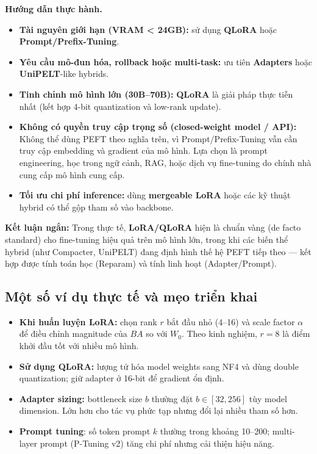 \textbf{Hướng dẫn thực hành.}
\begin{itemize}
	\item \textbf{Tài nguyên giới hạn (VRAM < 24GB):} sử dụng \textbf{QLoRA} hoặc \textbf{Prompt/Prefix-Tuning}.  
	\item \textbf{Yêu cầu mô-đun hóa, rollback hoặc multi-task:} ưu tiên \textbf{Adapters} hoặc \textbf{UniPELT}-like hybrids.  
	\item \textbf{Tinh chỉnh mô hình lớn (30B–70B):} \textbf{QLoRA} là giải pháp thực tiễn nhất (kết hợp 4-bit quantization và low-rank update).  
	\item \textbf{Không có quyền truy cập trọng số (closed-weight model / API):} Không thể dùng PEFT theo nghĩa trên, vì Prompt/Prefix-Tuning vẫn cần truy cập embedding và gradient của mô hình. Lựa chọn là prompt engineering, học trong ngữ cảnh, RAG, hoặc dịch vụ fine-tuning do chính nhà cung cấp mô hình cung cấp.
	\item \textbf{Tối ưu chi phí inference:} dùng \textbf{mergeable LoRA} hoặc các kỹ thuật hybrid có thể gộp tham số vào backbone.  
\end{itemize}

\textbf{Kết luận ngắn:}  
Trong thực tế, \textbf{LoRA/QLoRA} hiện là chuẩn vàng (de facto standard) cho fine-tuning hiệu quả trên mô hình lớn, trong khi các biến thể hybrid (như Compacter, UniPELT) đang định hình thế hệ PEFT tiếp theo — kết hợp được tính toán học (Reparam) và tính linh hoạt (Adapter/Prompt).

\subsection{Một số ví dụ thực tế và mẹo triển khai}
\label{ssec:practical}
\begin{itemize}
	\item \textbf{Khi huấn luyện LoRA:} chọn rank $r$ bắt đầu nhỏ (4--16) và scale factor $\alpha$ để điều chỉnh magnitude của $BA$ so với $W_0$. Theo kinh nghiệm, $r=8$ là điểm khởi đầu tốt với nhiều mô hình.
	\item \textbf{Sử dụng QLoRA:} lượng tử hóa model weights sang NF4 và dùng double quantization; giữ adapter ở 16-bit để gradient ổn định.
	\item \textbf{Adapter sizing:} bottleneck size $b$ thường đặt $b \in [32,256]$ tùy model dimension. Lớn hơn cho tác vụ phức tạp nhưng đổi lại nhiều tham số hơn.
	\item \textbf{Prompt tuning}: số token prompt $k$ thường trong khoảng 10--200; multi-layer prompt (P-Tuning v2) tăng chi phí nhưng cải thiện hiệu năng.
\end{itemize}


